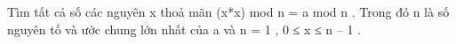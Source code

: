 Tìm tất cả số các nguyên x thoả mãn (x*x) mod n = a mod n . Trong đó n là số nguyên tố và ước chung lớn nhất của a và n = 1 , 0 ≤ x ≤ n – 1 .  

\